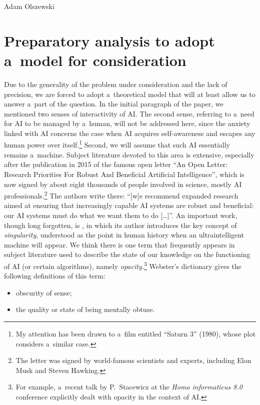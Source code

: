 \begin{artengenv}{Adam Olszewski}
\section{Preparatory analysis to adopt a~model for consideration}
Due to the generality of the problem under consideration and the lack of precision, we are forced to adopt a~theoretical model that will at least allow us to answer a~part of the question. In the initial paragraph of the paper, we mentioned two senses of interactivity of AI. The second sense, referring to a~need for AI to be managed by a~human, will not be addressed here, since the anxiety linked with AI concerns the case when AI acquires self-awareness and escapes any human power over itself.\footnote{My attention has been drawn to a~film entitled ``Saturn 3'' (1980), whose plot considers a~similar case.} Second, we will assume that such AI essentially remains a~machine. Subject literature devoted to this area is extensive, especially after the publication in 2015 of the famous open letter ``An Open Letter: Research Priorities For Robust And Beneficial Artificial Intelligence'', which is now signed by about eight thousands of people involved in science, mostly AI professionals.\footnote{The letter was signed by world-famous scientists and experts, including Elon Musk and Steven Hawking.} The authors write there: ``[w]e recommend expanded research aimed at ensuring that increasingly capable AI systems are robust and beneficial: our AI systems must do what we want them to do [\ldots]''. An important work, though long forgotten, is
\parencite[][]{good_speculations_1965}, %
 in which its author introduces the key concept of \textit{singularity}, understood as the point in human history when an ultraintelligent machine will appear. We think there is one term that frequently appears in subject literature used to describe the state of our knowledge on the functioning of AI (or certain algorithms), namely \textit{opacity.}\footnote{For example, a~recent talk by P.~Stacewicz at the \textit{Homo informaticus 8.0} conference explicitly dealt with opacity in the context of AI.} Webster's dictionary gives the following definitions of this term:
\begin{itemize}
\item obscurity of sense;
\item the quality or state of being mentally obtuse.
\end{itemize}

\end{artengenv}
